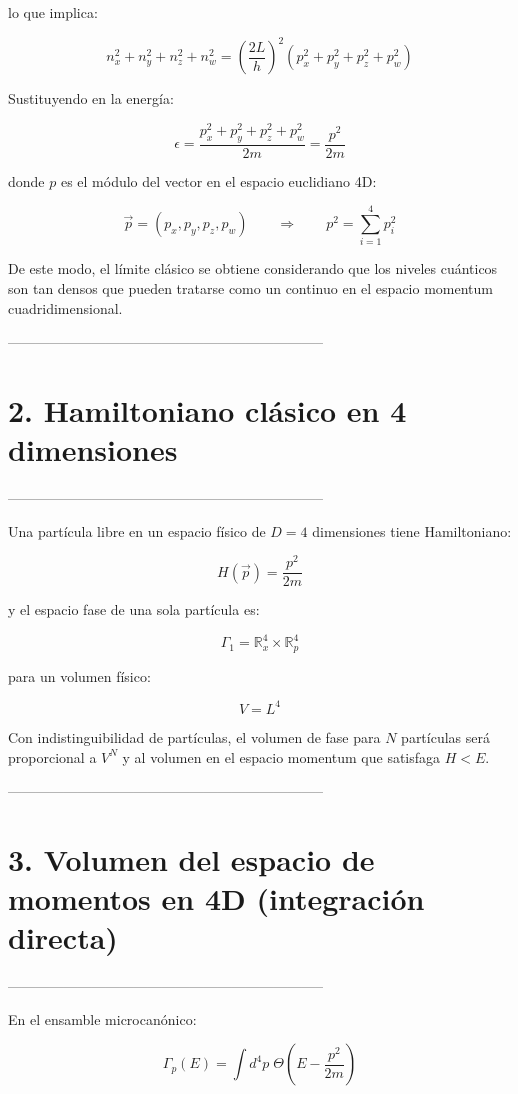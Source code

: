 \documentclass{article}
\begin{document}
lo que implica:

\[
n_{x}^{2}+n_{y}^{2}+n_{z}^{2}+n_{w}^{2}
= \left( \frac{2L}{h} \right)^{2}(p_{x}^{2}+p_{y}^{2}+p_{z}^{2}+p_{w}^{2})
\]

Sustituyendo en la energía:

\[
\epsilon
= \frac{p_{x}^{2}+p_{y}^{2}+p_{z}^{2}+p_{w}^{2}}{2m}
= \frac{p^{2}}{2m}
\]

donde \(p\) es el módulo del vector en el espacio euclidiano 4D:

\[
\vec{p}=(p_{x},p_{y},p_{z},p_{w})
\qquad \Rightarrow \qquad p^{2}=\sum_{i=1}^{4} p_{i}^{2}
\]

De este modo, el límite clásico se obtiene considerando que los niveles cuánticos
son tan densos que pueden tratarse como un continuo en el espacio momentum
cuadridimensional.

--------------------------------------------------------------------
\section*{\textcolor{Apple Green}{2. Hamiltoniano clásico en 4 dimensiones}}
--------------------------------------------------------------------

Una partícula libre en un espacio físico de \(D=4\) dimensiones tiene Hamiltoniano:

\[
H(\vec{p}) = \frac{p^{2}}{2m}
\]

y el espacio fase de una sola partícula es:

\[
\Gamma_{1} = \mathbb{R}^{4}_{x} \times \mathbb{R}^{4}_{p}
\]

para un volumen físico:

\[
V = L^{4}
\]

Con indistinguibilidad de partículas, el volumen de fase para \(N\) partículas será
proporcional a \(V^{N}\) y al volumen en el espacio momentum que satisfaga
\(H<E\).

--------------------------------------------------------------------
\section*{\textcolor{Apple Green}{3. Volumen del espacio de momentos en 4D (integración directa)}}
--------------------------------------------------------------------

En el ensamble microcanónico:

\[
\Gamma_{p}(E)
= \int d^{4}p \;
\Theta\!\left(E-\frac{p^{2}}{2m} \right)
\]
\end{document}
